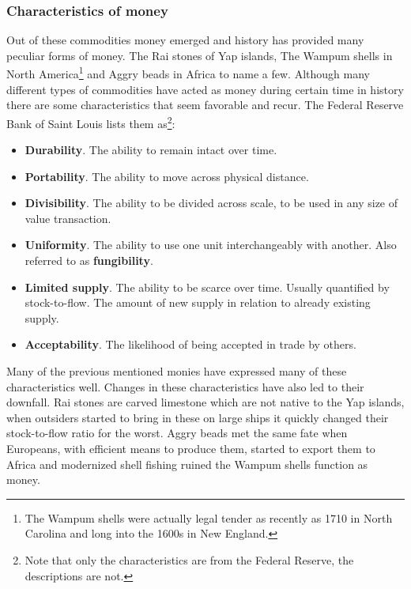\subsubsection{Characteristics of money}
	\label{sec:characteristics:money}

Out of these commodities money emerged and history has provided many peculiar forms of money. The Rai stones of Yap islands, The Wampum shells in North America\footnote{The Wampum shells were actually legal tender as recently as 1710 in North Carolina and long into the 1600s in New England.}\cite{szabo:shelling:out} and Aggry beads in Africa to name a few. Although many different types of commodities have acted as money during certain time in history there are some characteristics that seem favorable and recur. The Federal Reserve Bank of Saint Louis lists them as\cite{fed:function:money}\footnote{Note that only the characteristics are from the Federal Reserve, the descriptions are not.}:

\begin{itemize}
	\item \textbf{Durability}. The ability to remain intact over time.
	
	\item \textbf{Portability}. The ability to move across physical distance.
	
	\item \textbf{Divisibility}. The ability to be divided across scale, to be used in any size of value transaction.
	
	\item \textbf{Uniformity}. The ability to use one unit interchangeably with another. Also referred to as \textbf{fungibility}.
	
	\item \textbf{Limited supply}. The ability to be scarce over time. Usually quantified by stock-to-flow. The amount of new supply in relation to already existing supply.
	
	\item \textbf{Acceptability}. The likelihood of being accepted in trade by others.
\end{itemize}

Many of the previous mentioned monies have expressed many of these characteristics well. Changes in these characteristics have also led to their downfall. Rai stones are carved limestone which are not native to the Yap islands, when outsiders started to bring in these on large ships it quickly changed their stock-to-flow ratio for the worst\cite{ammous:bitcoin:standard}. Aggry beads met the same fate when Europeans, with efficient means to produce them, started to export them to Africa and modernized shell fishing ruined the Wampum shells function as money\cite{szabo:shelling:out}.

